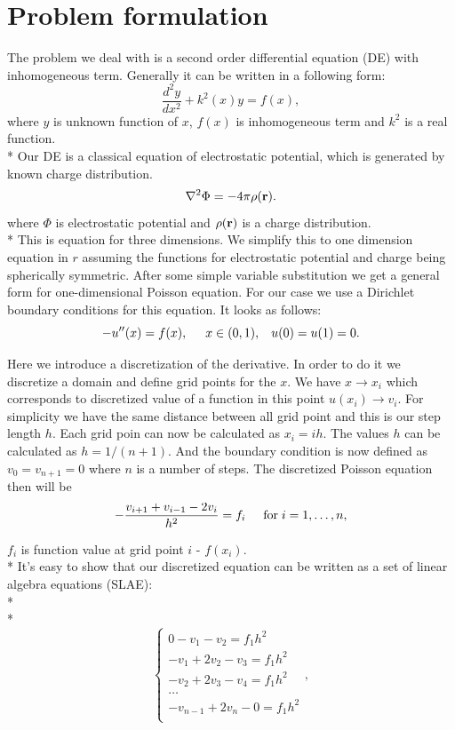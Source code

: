 \documentclass[10pt]{article}
\begin{document}
\section{Problem formulation}
The problem we deal with is a second order differential equation (DE) with inhomogeneous term. Generally it can be written in a following form:
\[
\frac{d^2y}{dx^2}+k^2(x)y = f(x),
\]
where $y$ is unknown function of $x$, $f(x)$ is inhomogeneous term and $k^2$ is a real function.\\* 
Our DE is a classical equation of electrostatic potential, which is generated by known charge distribution. 
\[
\nabla^2 \Phi = -4\pi \rho ({\bf r}).
\]
where $\Phi$ is electrostatic potential and $\rho ({\bf r})$ is a charge distribution. \\* 
This is equation for three dimensions. We simplify this to one dimension equation in $r$ assuming the functions for electrostatic potential and charge  being spherically symmetric. After some simple variable substitution we get a general form for one-dimensional Poisson equation. For our case we use a Dirichlet boundary conditions for this equation. It looks as follows:
\begin{equation}\label{equ:one}
-u''(x) = f(x), \hspace{0.5cm} x\in(0,1), \hspace{0.3cm} u(0) = u(1) = 0.
\end{equation}

Here we introduce a discretization of the derivative. In order to do it we discretize a domain and define grid points for the $ x $. We have $x\rightarrow x_{i}$ which corresponds to discretized value of a function in this point $u(x_{i})\rightarrow v_i$. For simplicity we have the same distance between all grid point and this is our step length $ h $. Each grid poin can now be calculated as $x_i=ih$. The values $ h $ can be calculated as $h=1/(n+1)$. And the boundary condition is now defined as $v_0 = v_{n+1} = 0$ where $ n $ is a number of steps. The discretized Poisson equation then will be
\[
   -\frac{v_{i+1}+v_{i-1}-2v_i}{h^2} = f_i  \hspace{0.5cm} \mathrm{for} \hspace{0.1cm} i=1,\dots, n,
\]

 $f_i$ is function value at grid point $i$ \-- $f(x_i)$. \\* 
 It's easy to show that our discretized equation can be written as a set of linear algebra equations (SLAE):
 \\* 
  \\* 
\begin{equation}
\begin{cases}
0 - v_{1}-v_{2} = f_1h^2 \\ -v_{1}+2v_{2}-v_{3} = f_1h^2  \\ 
-v_{2}+2v_{3}-v_{4} = f_1h^2  \\ \dots  \\ -v_{n-1}+2v_{n}-0= f_1h^2 \\
\end{cases},
\end{equation}
\end{document}
